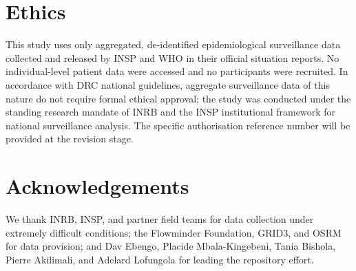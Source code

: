 \documentclass[12pt,a4paper]{article}
\begin{document}
\section*{Ethics}
This study uses only aggregated, de-identified epidemiological surveillance
data collected and released by INSP and WHO in their official situation
reports. No individual-level patient data were accessed and no participants
were recruited. In accordance with DRC national guidelines, aggregate
surveillance data of this nature do not require formal ethical approval;
the study was conducted under the standing research mandate of INRB and the INSP
institutional framework for national surveillance analysis.
The specific authorisation reference number will be provided at
the revision stage.

\section*{Acknowledgements}
We thank INRB, INSP, and partner field teams for data collection under
extremely difficult conditions; the Flowminder Foundation, GRID3, and OSRM
for data provision; and Dav Ebengo, Placide Mbala-Kingebeni, Tania Bishola,
Pierre Akilimali, and Adelard Lofungola for leading the repository effort.

\clearpage
\end{document}
